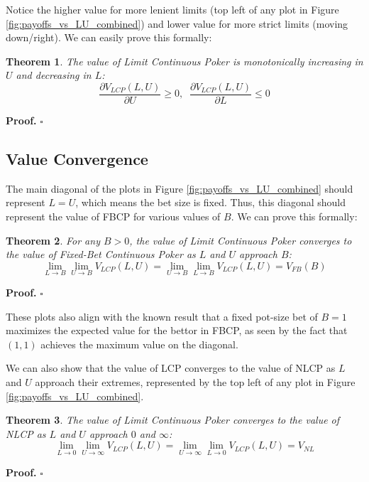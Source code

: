 \documentclass[a4paper,12pt]{article}
\theoremstyle{plain}
\newtheorem{theorem}{Theorem}[section]
\theoremstyle{definition}
\newenvironment{customproof}[1][Proof]{\noindent\textbf{#1.} }{\hfill$\square$\vspace{1em}}
\begin{document}
Notice the higher value for more lenient limits (top left of any plot in Figure \ref{fig:payoffs_vs_LU_combined}) and lower value for more strict limits (moving down/right). We can easily prove this formally:

\begin{theorem}
    The value of Limit Continuous Poker is monotonically increasing in $U$ and decreasing in $L$:
\[
    \frac{\partial V_{LCP}(L, U)}{\partial U} \geq 0, \;\; \frac{\partial V_{LCP}(L, U)}{\partial L} \leq 0
\]
\end{theorem}
\begin{customproof}
\end{customproof}

\subsection{Value Convergence}

The main diagonal of the plots in Figure \ref{fig:payoffs_vs_LU_combined} should represent $L=U$, which means the bet size is fixed. Thus, this diagonal should represent the value of FBCP for various values of $B$. We can prove this formally:

\begin{theorem}
    For any $B > 0$, the value of Limit Continuous Poker converges to the value of Fixed-Bet Continuous Poker as $L$ and $U$ approach $B$:
\[
\lim_{L \to B} \lim_{U \to B} V_{LCP}(L, U) = \lim_{U \to B} \lim_{L \to B} V_{LCP}(L, U) = V_{FB}(B)
\]
\end{theorem}

\begin{customproof}
\end{customproof}

These plots also align with the known result that a fixed pot-size bet of $B=1$ maximizes the expected value for the bettor in FBCP, as seen by the fact that $(1, 1)$ achieves the maximum value on the diagonal. 

We can also show that the value of LCP converges to the value of NLCP as $L$ and $U$ approach their extremes, represented by the top left of any plot in Figure \ref{fig:payoffs_vs_LU_combined}.

\begin{theorem}
    The value of Limit Continuous Poker converges to the value of NLCP as $L$ and $U$ approach $0$ and $\infty$:
\[
\lim_{L \to 0} \lim_{U \to \infty} V_{LCP}(L, U) = \lim_{U \to \infty} \lim_{L \to 0} V_{LCP}(L, U) = V_{NL}
\]
\end{theorem}
\begin{customproof}
\end{customproof}
\end{document}
